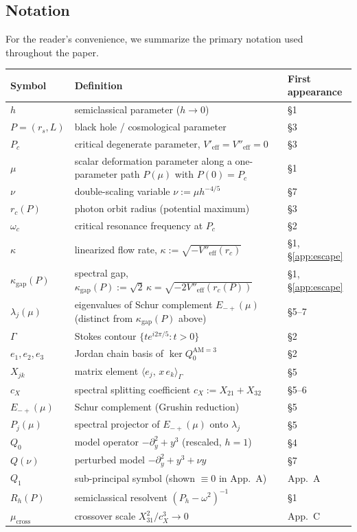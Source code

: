 \documentclass[12pt,a4paper]{amsart}
\theoremstyle{remark}
\begin{document}
\subsection*{Notation}

\leavevmode\vspace{-\baselineskip}

\noindent
For the reader's convenience, we summarize the primary notation
used throughout the paper.

\medskip
\begin{center}
{\small
\renewcommand{\arraystretch}{1.35}
\begin{tabular}{@{}l>{\raggedright\arraybackslash}p{6.4cm}l@{}}
\hline
Symbol & Definition & First appearance \\
\hline
$h$ & semiclassical parameter ($h \to 0$) & \S1 \\
$P = (r_s, L)$ & black hole / cosmological parameter & \S3 \\
$P_c$ & critical degenerate parameter, $V'_{\mathrm{eff}}=V''_{\mathrm{eff}}=0$ & \S3 \\
$\mu$ & scalar deformation parameter along a one-parameter path $P(\mu)$ with $P(0)=P_c$ & \S1 \\
$\nu$ & double-scaling variable $\nu := \mu h^{-4/5}$ & \S7 \\
$r_c(P)$ & photon orbit radius (potential maximum) & \S3 \\
$\omega_c$ & critical resonance frequency at $P_c$ & \S2 \\
$\kappa$ & linearized flow rate, $\kappa := \sqrt{-V''_{\mathrm{eff}}(r_c)}$ & \S1, \S\ref{app:escape} \\
$\kappa_{\mathrm{gap}}(P)$ & spectral gap, $\kappa_{\mathrm{gap}}(P) := \sqrt{2}\,\kappa = \sqrt{-2V''_{\mathrm{eff}}(r_c(P))}$ & \S1, \S\ref{app:escape} \\
$\lambda_j(\mu)$ & eigenvalues of Schur complement $E_{-+}(\mu)$ (distinct from $\kappa_{\mathrm{gap}}(P)$ above) & \S5--7 \\
$\Gamma$ & Stokes contour $\{te^{i2\pi/5} : t > 0\}$ & \S2 \\
$e_1, e_2, e_3$ & Jordan chain basis of $\ker Q_0^{\mathrm{AM}=3}$ & \S2 \\
$X_{jk}$ & matrix element $\langle e_j,\, x\, e_k\rangle_\Gamma$ & \S5 \\
$c_X$ & spectral splitting coefficient $c_X := X_{21} + X_{32}$ & \S5--6 \\
$E_{-+}(\mu)$ & Schur complement (Grushin reduction) & \S5 \\
$P_j(\mu)$ & spectral projector of $E_{-+}(\mu)$ onto $\lambda_j$ & \S5 \\
$Q_0$ & model operator $-\partial_y^2 + y^3$ (rescaled, $h=1$) & \S4 \\
$Q(\nu)$ & perturbed model $-\partial_y^2 + y^3 + \nu y$ & \S7 \\
$Q_1$ & sub-principal symbol (shown $\equiv 0$ in App.~A) & App.~A \\
$R_h(P)$ & semiclassical resolvent $(P_h - \omega^2)^{-1}$ & \S1 \\
$\mu_{\mathrm{cross}}$ & crossover scale $X_{31}^2/c_X^3 \to 0$ & App.~C \\
\hline
\end{tabular}
}
\end{center}
\end{document}

